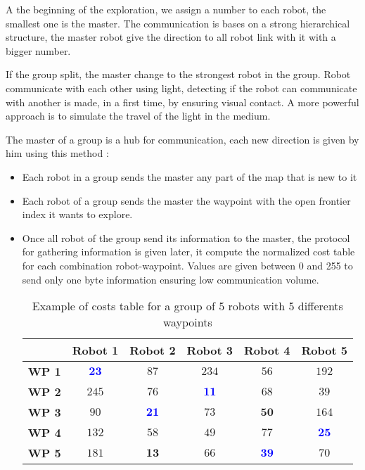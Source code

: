 \documentclass[main.tex]{subfiles}
\begin{document}
A the beginning of the exploration, we assign a number to each robot, the smallest one is the master.
The communication is bases on a strong hierarchical structure, the master robot give the direction to all robot link with it with a bigger number.

If the group split, the master change to the strongest robot in the group.
Robot communicate with each other using light, detecting if the robot can communicate with another is made, in a first time, by ensuring visual contact. A more powerful approach is to simulate the travel of the light in the medium.

The master of a group is a hub for communication, each new direction is given by him using this method :

\begin{itemize}
	\item Each robot in a group sends the master any part of the map that is new to it
	\item Each robot of a group sends the master the waypoint with the open frontier index it wants to explore.
	\item Once all robot of the group send its information to the master, the protocol for gathering information is given later, it compute the normalized cost table for each combination robot-waypoint. Values are given between 0 and 255 to send only one byte information ensuring low communication volume. 
	
	\begin{table}[H]
		\centering
		\begin{tabular}{|c|c|c|c|c|c|}
			\hline
			& \textbf{Robot 1} & \textbf{Robot 2} & \textbf{Robot 3} & \textbf{Robot 4} & \textbf{Robot 5}\\
			\hline
			\textbf{WP 1} & \textcolor{blue}{$\mathbf{23}$} & $87$ & $234$ & $56$ & $192$ \\
			\hline
			\textbf{WP 2} & $245$ & $76$ & \textcolor{blue}{$\mathbf{11}$} & $68$ & $39$ \\
			\hline
			\textbf{WP 3} & $90$ & \textcolor{blue}{$\mathbf{21}$} & $73$ & $\mathbf{50}$ & $164$ \\
			\hline
			\textbf{WP 4} & $132$ & $58$ & $49$ & $77$ & \textcolor{blue}{$\mathbf{25}$} \\
			\hline
			\textbf{WP 5} & $181$ & $\mathbf{13}$ & $66$ & \textcolor{blue}{$\mathbf{39}$} & $70$ \\ 
			\hline
	
		\end{tabular}
		\caption{Example of costs table for a group of 5 robots with 5 differents waypoints}
		\label{tab:example_5R5WP}
	\end{table}
	

\end{itemize}
\end{document}

